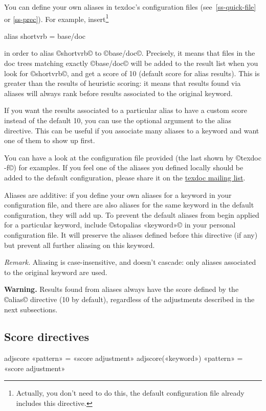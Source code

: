 \documentclass[a4paper, oneside]{scrartcl}
\makeatletter
\newenvironment{htcode}{%
  \SaveVerbatim[samepage, gobble=2]{verbmat}%
  }{%
  \endSaveVerbatim
  \par\medskip\noindent\hspace*{\parindent}%
  \BUseVerbatim{verbmat}%
  \par\medskip\@endpetrue}
\newcommand\tdml{\href{mailto:texdoc@tug.org}{texdoc mailing list}\xspace}
\makeatother
\begin{document}
You can define your own aliases in texdoc's configuration files
(see~\ref{ss-quick-file} or \ref{ss-prec}). For example,
insert\footnote{Actually, you don't need to do this, the default configuration
  file already includes this directive.}
\begin{htcode}
  alias shortvrb = base/doc
\end{htcode}
in order to alias ©shortvrb© to ©base/doc©. Precisely, it means that files in
the doc trees matching exactly ©base/doc© will be added to the result list
when you look for ©shortvrb©, and get a score of 10 (default score for alias
results). This is greater than the results of heuristic scoring: it means that
results found via aliases will always rank before results associated to the
original keyword.

If you want the results associated to a particular alias to have a custom
score instead of the default 10, you can use the optional argument to the
alias directive. This can be useful if you associate many aliases to
a keyword and want one of them to show up first.

You can have a look at the configuration file provided (the last shown by
©texdoc -f©) for examples.  If you feel one of the aliases you defined locally
should be added to the default configuration, please share it on the \tdml.

Aliases are additive: if you define your own aliases for a keyword in your
configuration file, and there are also aliases for the same keyword in the
default configuration, they will add up. To prevent the default aliases
from begin applied for a particular keyword, include ©stopalias «keyword»© in
your personal configuration file. It will preserve the aliases defined before
this directive (if any) but prevent all further aliasing on this keyword.

\textit{Remark.} Aliasing is case-insensitive, and doesn't cascade:
only aliases associated to the original keyword are used.

\textbf{Warning.} Results found from aliases always have the score defined by
the ©alias© directive (10 by default), regardless of the adjustments described
in the next subsections.

\subsection{Score directives}\label{ss-score}

\begin{htcode}
  adjscore «pattern» = «score adjustment»
  adjscore(«keyword») «pattern» = «score adjustment»
\end{htcode}
\end{document}
